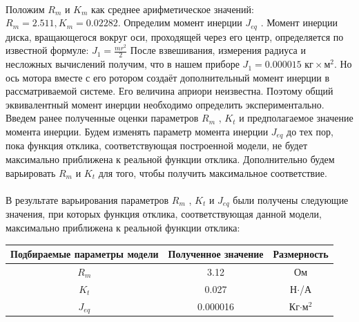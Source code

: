 \documentclass[12pt]{article}
\begin{document}
\paragraph{}
Положим $R_m$ и $K_m$ как среднее арифметическое значений:
$R_m = 2.511, K_m = 0.02282$.
Определим момент инерции $J_{eq}$ .
Момент инерции диска, вращающегося вокруг оси,
проходящей через его центр, определяется по известной
формуле:
$J_1 =\frac{mr^2}{2}$
После взвешивания, измерения радиуса и несложных
вычислений получим, что в нашем приборе $J_1 = 0.000015 \textit{ кг}\times \textit{м}^2$.
Но ось мотора вместе с его ротором создаёт дополнительный
момент инерции в рассматриваемой системе. Его величина
априори неизвестна. Поэтому общий эквивалентный момент
инерции необходимо определить экспериментально.
Введем ранее полученные оценки параметров $R_m$ , $K_t$ и
предполагаемое значение момента инерции. Будем изменять
параметр момента инерции $J_{eq}$ до тех пор, пока функция
отклика, соответствующая построенной модели, не будет
максимально приближена к реальной функции отклика.
Дополнительно будем варьировать $R_m$ и $K_t$ для того, чтобы
получить максимальное соответствие.
\paragraph{}
В результате варьирования параметров $R_m$ , $K_t$ и $J_{eq}$ были
получены следующие значения, при которых функция
отклика, соответствующая данной модели, максимально
приближена к реальной функции отклика:

\begin{center}
	\begin{tabular}{|c|c|c|}
		\hline
		Подбираемые параметры модели& Полученное значение & Размерность\\
		\hline
		$R_m$ & 3.12 & Ом\\
		$K_t$ & 0.027 & Н$\cdot$/А\\
		$J_{eq}$ & 0.000016 & Кг$\cdot$м$^2$\\
		\hline 
	\end{tabular}
\end{center}
\end{document}
